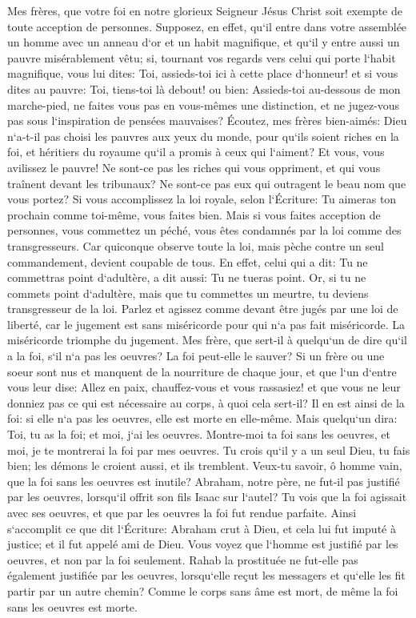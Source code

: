 \verse Mes frères, que votre foi en notre glorieux Seigneur Jésus Christ soit exempte de toute acception de personnes. 
\verse Supposez, en effet, qu`il entre dans votre assemblée un homme avec un anneau d`or et un habit magnifique, et qu`il y entre aussi un pauvre misérablement vêtu; 
\verse si, tournant vos regards vers celui qui porte l`habit magnifique, vous lui dites: Toi, assieds-toi ici à cette place d`honneur! et si vous dites au pauvre: Toi, tiens-toi là debout! ou bien: Assieds-toi au-dessous de mon marche-pied, 
\verse ne faites vous pas en vous-mêmes une distinction, et ne jugez-vous pas sous l`inspiration de pensées mauvaises? 
\verse Écoutez, mes frères bien-aimés: Dieu n`a-t-il pas choisi les pauvres aux yeux du monde, pour qu`ils soient riches en la foi, et héritiers du royaume qu`il a promis à ceux qui l`aiment? 
\verse Et vous, vous avilissez le pauvre! Ne sont-ce pas les riches qui vous oppriment, et qui vous traînent devant les tribunaux? 
\verse Ne sont-ce pas eux qui outragent le beau nom que vous portez? 
\verse Si vous accomplissez la loi royale, selon l`Écriture: Tu aimeras ton prochain comme toi-même, vous faites bien. 
\verse Mais si vous faites acception de personnes, vous commettez un péché, vous êtes condamnés par la loi comme des transgresseurs. 
\verse Car quiconque observe toute la loi, mais pèche contre un seul commandement, devient coupable de tous. 
\verse En effet, celui qui a dit: Tu ne commettras point d`adultère, a dit aussi: Tu ne tueras point. Or, si tu ne commets point d`adultère, mais que tu commettes un meurtre, tu deviens transgresseur de la loi. 
\verse Parlez et agissez comme devant être jugés par une loi de liberté, 
\verse car le jugement est sans miséricorde pour qui n`a pas fait miséricorde. La miséricorde triomphe du jugement. 
\verse Mes frère, que sert-il à quelqu`un de dire qu`il a la foi, s`il n`a pas les oeuvres? La foi peut-elle le sauver? 
\verse Si un frère ou une soeur sont nus et manquent de la nourriture de chaque jour, 
\verse et que l`un d`entre vous leur dise: Allez en paix, chauffez-vous et vous rassasiez! et que vous ne leur donniez pas ce qui est nécessaire au corps, à quoi cela sert-il? 
\verse Il en est ainsi de la foi: si elle n`a pas les oeuvres, elle est morte en elle-même. 
\verse Mais quelqu`un dira: Toi, tu as la foi; et moi, j`ai les oeuvres. Montre-moi ta foi sans les oeuvres, et moi, je te montrerai la foi par mes oeuvres. 
\verse Tu crois qu`il y a un seul Dieu, tu fais bien; les démons le croient aussi, et ils tremblent. 
\verse Veux-tu savoir, ô homme vain, que la foi sans les oeuvres est inutile? 
\verse Abraham, notre père, ne fut-il pas justifié par les oeuvres, lorsqu`il offrit son fils Isaac sur l`autel? 
\verse Tu vois que la foi agissait avec ses oeuvres, et que par les oeuvres la foi fut rendue parfaite. 
\verse Ainsi s`accomplit ce que dit l`Écriture: Abraham crut à Dieu, et cela lui fut imputé à justice; et il fut appelé ami de Dieu. 
\verse Vous voyez que l`homme est justifié par les oeuvres, et non par la foi seulement. 
\verse Rahab la prostituée ne fut-elle pas également justifiée par les oeuvres, lorsqu`elle reçut les messagers et qu`elle les fit partir par un autre chemin? 
\verse Comme le corps sans âme est mort, de même la foi sans les oeuvres est morte. 

